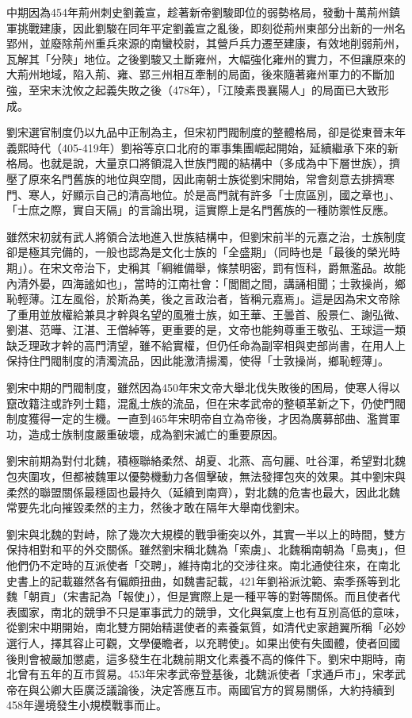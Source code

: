 中期因為454年荊州刺史劉義宣，趁著新帝劉駿即位的弱勢格局，發動十萬荊州鎮軍挑戰建康，因此劉駿在同年平定劉義宣之亂後，即刻從荊州東部分出新的一州名郢州，並廢除荊州重兵來源的南蠻校尉，其營戶兵力遷至建康，有效地削弱荊州，瓦解其「分陝」地位。之後劉駿又土斷雍州，大幅強化雍州的實力，不但讓原來的大荊州地域，陷入荊、雍、郢三州相互牽制的局面，後來隨著雍州軍力的不斷加強，至宋末沈攸之起義失敗之後（478年），「江陵素畏襄陽人」的局面已大致形成。

劉宋選官制度仍以九品中正制為主，但宋初門閥制度的整體格局，卻是從東晉末年義熙時代（405-419年）劉裕等京口北府的軍事集團崛起開始，延續繼承下來的新格局。也就是說，大量京口將領混入世族門閥的結構中（多成為中下層世族），擠壓了原來名門舊族的地位與空間，因此南朝士族從劉宋開始，常會刻意去排擠寒門、寒人，好顯示自己的清高地位。於是高門就有許多「士庶區別，國之章也」、「士庶之際，實自天隔」的言論出現，這實際上是名門舊族的一種防禦性反應。

雖然宋初就有武人將領合法地進入世族結構中，但劉宋前半的元嘉之治，士族制度卻是極其完備的，一般也認為是文化士族的「全盛期」（同時也是「最後的榮光時期」）。在宋文帝治下，史稱其「綱維備舉，條禁明密，罰有恆科，爵無濫品。故能內清外晏，四海謐如也」，當時的江南社會：「閭閻之間，講誦相聞；士敦操尚，鄉恥輕薄。江左風俗，於斯為美，後之言政治者，皆稱元嘉焉」。這是因為宋文帝除了重用並放權給兼具才幹與名望的風雅士族，如王華、王曇首、殷景仁、謝弘微、劉湛、范曄、江湛、王僧綽等，更重要的是，文帝也能夠尊重王敬弘、王球這一類缺乏理政才幹的高門清望，雖不給實權，但仍任命為副宰相與吏部尚書，在用人上保持住門閥制度的清濁流品，因此能激清揚濁，使得「士敦操尚，鄉恥輕薄」。

劉宋中期的門閥制度，雖然因為450年宋文帝大舉北伐失敗後的困局，使寒人得以竄改籍注或詐列士籍，混亂士族的流品，但在宋孝武帝的整頓革新之下，仍使門閥制度獲得一定的生機。一直到465年宋明帝自立為帝後，才因為廣募部曲、濫賞軍功，造成士族制度嚴重破壞，成為劉宋滅亡的重要原因。

劉宋前期為對付北魏，積極聯絡柔然、胡夏、北燕、高句麗、吐谷渾，希望對北魏包夾圍攻，但都被魏軍以優勢機動力各個擊破，無法發揮包夾的效果。其中劉宋與柔然的聯盟關係最穩固也最持久（延續到南齊），對北魏的危害也最大，因此北魏常要先北向摧毀柔然的主力，然後才敢在隔年大舉南伐劉宋。

劉宋與北魏的對峙，除了幾次大規模的戰爭衝突以外，其實一半以上的時間，雙方保持相對和平的外交關係。雖然劉宋稱北魏為「索虜」、北魏稱南朝為「島夷」，但他們仍不定時的互派使者「交聘」，維持南北的交涉往來。南北通使往來，在南北史書上的記載雖然各有偏頗扭曲，如魏書記載，421年劉裕派沈範、索季孫等到北魏「朝貢」（宋書記為「報使」），但是實際上是一種平等的對等關係。而且使者代表國家，南北的競爭不只是軍事武力的競爭，文化與氣度上也有互別高低的意味，從劉宋中期開始，南北雙方開始精選使者的素養氣質，如清代史家趙翼所稱「必妙選行人，擇其容止可觀，文學優瞻者，以充聘使」。如果出使有失國體，使者回國後則會被嚴加懲處，這多發生在北魏前期文化素養不高的條件下。劉宋中期時，南北曾有五年的互市貿易。453年宋孝武帝登基後，北魏派使者「求通戶市」，宋孝武帝在與公卿大臣廣泛議論後，決定答應互市。兩國官方的貿易關係，大約持續到458年邊境發生小規模戰事而止。

